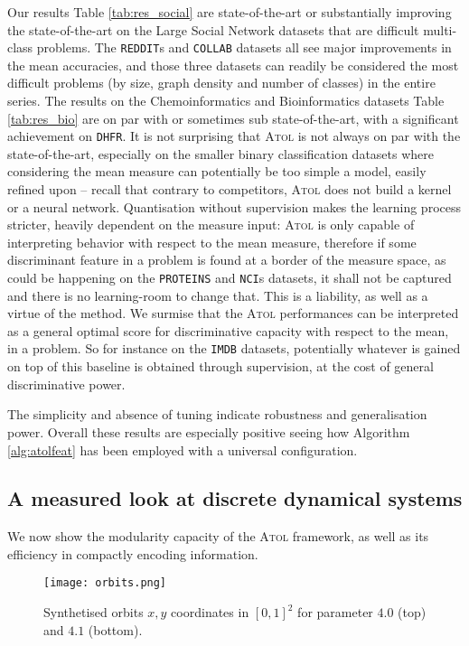 \documentclass[twoside]{article}
\begin{document}
Our results Table \ref{tab:res_social} are {state-of-the-art} or substantially improving the {state-of-the-art} on the Large Social Network datasets that are difficult multi-class problems. The \texttt{REDDIT}s and \texttt{COLLAB} datasets all see major improvements in the mean accuracies, and those three datasets can readily be considered the most difficult problems (by size, graph density and number of classes) in the entire series. The results on the Chemoinformatics and Bioinformatics datasets Table \ref{tab:res_bio} are on par with or sometimes sub state-of-the-art, with a significant achievement on \texttt{DHFR}. It is not surprising that \textsc{Atol} is not always on par with the state-of-the-art, especially on the smaller binary classification datasets where considering the mean measure can potentially be too simple a model, easily refined upon \--- recall that contrary to competitors, \textsc{Atol} does not build a kernel or a neural network. Quantisation without supervision makes the learning process stricter, heavily dependent on the measure input: \textsc{Atol} is only capable of interpreting behavior with respect to the mean measure, therefore if some discriminant feature in a problem is found at a border of the measure space, as could be happening on the \texttt{PROTEINS} and \texttt{NCI}s datasets, it shall not be captured and there is no learning-room to change that. This is a liability, as well as a virtue of the method. We surmise that the \textsc{Atol} performances can be interpreted as a general optimal score for discriminative capacity with respect to the mean, in a problem. So for instance on the \texttt{IMDB} datasets, potentially whatever is gained on top of this baseline is obtained through supervision, at the cost of general discriminative power.

The {simplicity} and absence of tuning indicate robustness and generalisation power. Overall these results are especially positive seeing how Algorithm \ref{alg:atolfeat} has been employed with a universal configuration. 


\subsection{A measured look at discrete dynamical systems}
\label{sec:ablation}

We now show the modularity capacity of the \textsc{Atol} framework, as well as its efficiency in compactly encoding information.

\begin{figure}[h]
	\centering
	\texttt{[image: orbits.png]}
	\caption{Synthetised orbits $x, y$ coordinates in $[0,1]^2$ for parameter $4.0$ (top) and $4.1$ (bottom).}
	\label{fig:orbits}
\end{figure}
\end{document}
